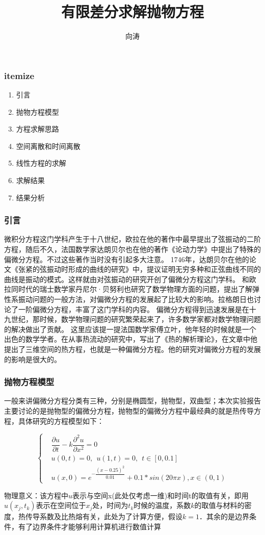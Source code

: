 \documentclass[UTF8]{beamer}
\author{向涛}
\title{有限差分求解抛物方程}
\institute{数学与计算科学学院}
\begin{document}
\frame{\titlepage} %

\begin{frame}[c]\frametitle{itemize}

\begin{enumerate}
\item 引言
\item 抛物方程模型
\item 方程求解思路
\item 空间离散和时间离散
\item 线性方程的求解
\item 求解结果
\item 结果分析
\end{enumerate}

\end{frame}

\begin{frame}[t]\frametitle{引言}

微积分方程这门学科产生于十八世纪，欧拉在他的著作中最早提出了弦振动的二阶方程，随后不久，法国数学家达朗贝尔也在他的著作《论动力学》中提出了特殊的偏微分方程。不过这些著作当时没有引起多大注意。
1746年，达朗贝尔在他的论文《张紧的弦振动时形成的曲线的研究》中，提议证明无穷多种和正弦曲线不同的曲线是振动的模式。这样就由对弦振动的研究开创了偏微分方程这门学科。
和欧拉同时代的瑞士数学家丹尼尔·贝努利也研究了数学物理方面的问题，提出了解弹性系振动问题的一般方法，对偏微分方程的发展起了比较大的影响。拉格朗日也讨论了一阶偏微分方程，丰富了这门学科的内容。
偏微分方程得到迅速发展是在十九世纪，那时候，数学物理问题的研究繁荣起来了，许多数学家都对数学物理问题的解决做出了贡献。
这里应该提一提法国数学家傅立叶，他年轻的时候就是一个出色的数学学者。在从事热流动的研究中，写出了《热的解析理论》，在文章中他提出了三维空间的热方程，也就是一种偏微分方程。他的研究对偏微分方程的发展的影响是很大的。

\end{frame}

\begin{frame}[t]\frametitle{抛物方程模型}

一般来讲偏微分方程分类有三种，分别是椭圆型，抛物型，双曲型；本次实验报告主要讨论的是抛物型的偏微分方程，抛物型的偏微分方程中最经典的就是热传导方程，具体研究的方程模型如下：

\begin{equation}
\left \{
\begin{aligned}
& \dfrac{\partial u}{\partial t}-k\dfrac{\partial^2 u}{\partial x^2}=0 \\
& u(0,t)=0,~~u(1,t)=0,~~t\in [0,0.1] \\
& u(x,0) = e^{-\dfrac{(x-0.25)^2}{0.01}}+0.1*sin(20\pi x), x\in (0,1)
\end{aligned}
\right.
\end{equation}

物理意义：该方程中$u$表示与空间x(此处仅考虑一维)和时间t的取值有关，即用$u(x_j,t_k)$表示在空间位于$x_j$处，时间为$t_k$时候的温度，系数$k$的取值与材料的密度，热传导系数及比热熔有关，此处为了计算方便，假设$k=1$．其余的是边界条件，有了边界条件才能够利用计算机进行数值计算

\end{frame}
\end{document}
